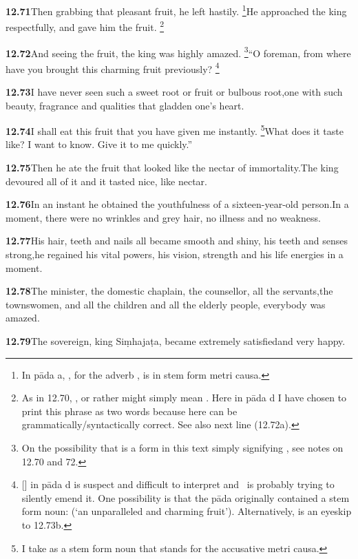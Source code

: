 \textbf{12.71}Then grabbing that pleasant fruit, he left hastily.%
\footnote{In pāda a, , for the adverb , is in stem form metri causa.  }He approached the king respectfully, and gave him the fruit.%
\footnote{As in 12.70, , or rather  might simply mean .                  Here in pāda d I have chosen to print this phrase as two words because here                  can be grammatically/syntactically correct. See also next line (12.72a).  }%


\textbf{12.72}And seeing the fruit, the king was highly amazed.%
\footnote{On the possibility that  is a form in this text simply signifying ,                 see notes on 12.70 and 72.  }``O foreman, from where have you brought this charming fruit previously?%
\footnote{[] in pāda d is suspect and difficult to interpret and                \Ed\ is probably trying to silently emend it.                 One possibility is that the pāda originally contained a stem form noun:                  (`an unparalleled and charming fruit').                 Alternatively,  is an eyeskip to 12.73b.  }%


\textbf{12.73}I have never seen such a sweet root or fruit or bulbous root,one with such beauty, fragrance and qualities that gladden one's heart.%


\textbf{12.74}I shall eat this fruit that you have given me instantly.%
\footnote{I take  as a stem form noun that stands for the accusative metri causa.  }What does it taste like? I want to know. Give it to me quickly.''%


\textbf{12.75}Then he ate the fruit that looked like the nectar of immortality.The king devoured all of it and it tasted nice, like nectar.%


\textbf{12.76}In an instant he obtained the youthfulness of a sixteen-year-old person.In a moment, there were no wrinkles and grey hair, no illness and no weakness.%


\textbf{12.77}His hair, teeth and nails all became smooth and shiny, his teeth and senses strong,he regained his vital powers, his vision, strength and his life energies in a moment.%


\textbf{12.78}The minister, the domestic chaplain, the counsellor, all the servants,the townswomen, and all the children and all the elderly people, everybody was amazed.%


\textbf{12.79}The sovereign, king Siṃhajaṭa, became extremely satisfiedand very happy.%


